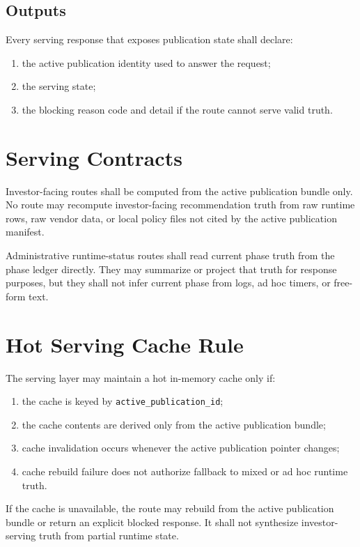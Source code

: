 \subsection{Outputs}
Every serving response that exposes publication state shall declare:
\begin{enumerate}[leftmargin=1.2cm]
    \item the active publication identity used to answer the request;
    \item the serving state;
    \item the blocking reason code and detail if the route cannot serve valid truth.
\end{enumerate}

\section{Serving Contracts}
Investor-facing routes shall be computed from the active publication bundle only. No route may recompute investor-facing recommendation truth from raw runtime rows, raw vendor data, or local policy files not cited by the active publication manifest.

Administrative runtime-status routes shall read current phase truth from the phase ledger directly. They may summarize or project that truth for response purposes, but they shall not infer current phase from logs, ad hoc timers, or free-form text.

\section{Hot Serving Cache Rule}
The serving layer may maintain a hot in-memory cache only if:
\begin{enumerate}[leftmargin=1.2cm]
    \item the cache is keyed by \texttt{active\_publication\_id};
    \item the cache contents are derived only from the active publication bundle;
    \item cache invalidation occurs whenever the active publication pointer changes;
    \item cache rebuild failure does not authorize fallback to mixed or ad hoc runtime truth.
\end{enumerate}

If the cache is unavailable, the route may rebuild from the active publication bundle or return an explicit blocked response. It shall not synthesize investor-serving truth from partial runtime state.

